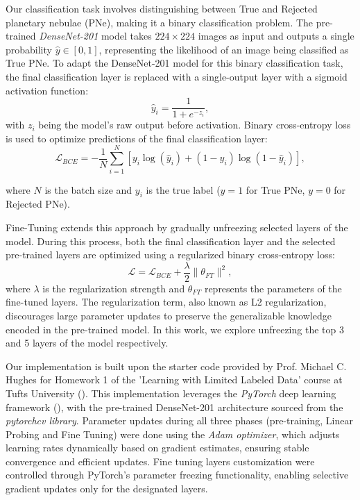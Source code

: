 \documentclass{article}
\begin{document}
Our classification task involves distinguishing between True and Rejected planetary nebulae (PNe), making it a binary classification problem. The pre-trained \textit{DenseNet-201} model takes $224 \times 224$ images as input and outputs a single probability $\hat{y} \in [0, 1]$, representing the likelihood of an image being classified as True PNe. To adapt the DenseNet-201 model for this binary classification task, the final classification layer is replaced with a single-output layer with a sigmoid activation function:
\[
\hat{y}_i = \frac{1}{1 + e^{-z_i}},
\]
with $z_i$ being the model’s raw output before activation. Binary cross-entropy loss is used to optimize predictions of the final classification layer:
\[
\mathcal{L}_{BCE} = -\frac{1}{N} \sum_{i=1}^N \left[ y_i \log(\hat{y}_i) + (1 - y_i) \log(1 - \hat{y}_i) \right],
\]

where $N$ is the batch size and $y_i$ is the true label ($y = 1$ for True PNe, $y = 0$ for Rejected PNe).


Fine-Tuning extends this approach by gradually unfreezing selected layers of the model. During this process, both the final classification layer and the selected pre-trained layers are optimized using a regularized binary cross-entropy loss:
\[
\mathcal{L} = \mathcal{L}_{BCE} + \frac{\lambda}{2} \|\theta_{FT}\|^2,
\]
where $\lambda$ is the regularization strength and $\theta_{FT}$ represents the parameters of the fine-tuned layers. The regularization term, also known as L2 regularization, discourages large parameter updates to preserve the generalizable knowledge encoded in the pre-trained model. In this work, we explore unfreezing the top 3 and 5 layers of the model respectively.


Our implementation is built upon the starter code provided by Prof. Michael C. Hughes for Homework 1 of the 'Learning with Limited Labeled Data' course at Tufts University (\cite{hughes_hw1_2024}). This implementation leverages the \textit{PyTorch} deep learning framework (\cite{paszke2019pytorch}), with the pre-trained DenseNet-201 architecture sourced from the \textit{pytorchcv library}. Parameter updates during all three phases (pre-training, Linear Probing and Fine Tuning) were done using the \textit{Adam optimizer}, which adjusts learning rates dynamically based on gradient estimates, ensuring stable convergence and efficient updates. Fine tuning layers customization were controlled through PyTorch’s parameter freezing functionality, enabling selective gradient updates only for the designated layers.
\end{document}
